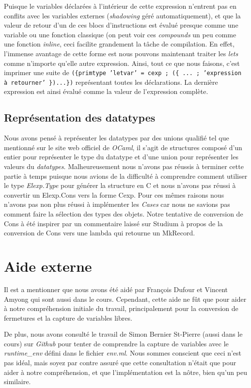 \documentclass{article}
\begin{document}
Puisque le variables déclarées à l'intérieur de cette expression n'entrent
pas en conflits avec les variables externes (\emph{shadowing} géré
automatiquement), et que la valeur de retour d'un de ces blocs d'instructions
est évalué presque comme une variable ou une fonction
classique (on peut voir ces \emph{compounds} un peu comme une fonction 
\emph{inline}, ceci facilite grandement la tâche de compilation. En effet,
l'immense avantage de cette forme est nous pouvons maintenant traiter les
\emph{lets} comme n'importe qu'elle autre expression. Ainsi, tout ce que
nous faisons, c'est imprimer une suite de
\texttt{(\{primtype 'letvar' = cexp ; (\{ ... ;
  'expression à retourner' \})...\})}
représentant toutes les déclarations. La dernière expression est ainsi évalué
comme la valeur de l'expression complète.


\subsection{Représentation des datatypes}
Nous avons pensé à représenter les datatypes par des unions qualifié tel que
mentionné sur le site web officiel de \emph{OCaml}, il s'agit de structures
composé d'un entier pour représenter le type du datatype et d'une union pour
représenter les valeurs du \emph{datatypes}. Malheureusement nous n'avons pas
réussis
à terminer cette partie à temps puisque nous avions de la difficulté à
comprendre comment utiliser le type \emph{Elexp.Type} pour générer la structure
en C et nous n'avons pas réussi à convertir un Elexp.Cons vers la forme Cexp.
Pour ces mêmes raisons nous n'avons pas non plus réussi à implémenter les
\emph{Cases} car nous ne savions pas comment faire la sélection des types
des objets. Notre tentative de conversion de Cons à été inspirer par un
commentaire laissé sur Studium à propos de la conversion de Cons vers
une lambda qui retourne un MkRecord.

\section{Aide externe}
Il est a mentionner que nous avons été aidé par François Dufour et Vincent
Amyong qui sont aussi dans le cours. Cependant, cette aide ne fût que pour aider
à notre compréhension initiale du travail, principalement pour la conversion de
fermetures et la capture de variables libres.

De plus, nous avons consulté le travail de Simon Bernier St-Pierre (aussi dans
le cours) sur \emph{Github} \cite{sbstp} pour tenter de comprendre la capture de
variables avec le \emph{runtime\_env} défini dans le fichier \emph{env.ml}.
Nous sommes conscient que ceci n'est pas idéal, mais soyez par contre assuré
que cette consultation n'était que pour aider à notre compréhension, et que
l'implémentation est la nôtre, bien qu'un peu similaire.
 
\end{document}
